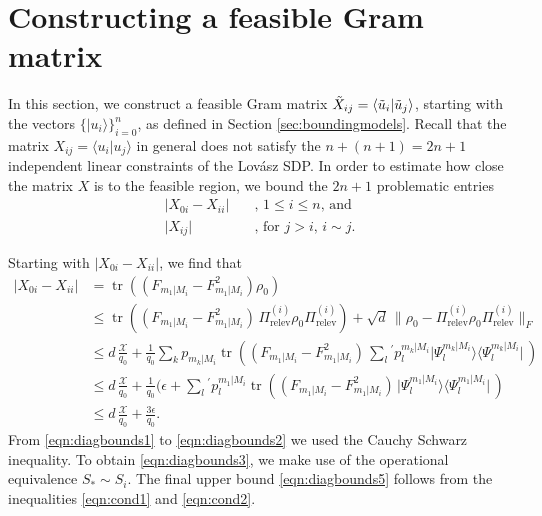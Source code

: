 \section{Constructing a feasible Gram matrix}

In this section, we construct a feasible Gram matrix $\Tilde{X}_{ij}=\langle \Tilde{u}_i \vert \Tilde{u}_j \rangle$, starting with the vectors $\{\vert u_i \rangle \}_{i=0}^n$, as defined in Section \ref{sec:boundingmodels}. Recall that the matrix $X_{ij}=\langle u_i \vert u_j \rangle$ in general does not satisfy the $n+(n+1)=2n+1$ independent linear constraints of the Lovász SDP. In order to estimate how close the matrix $X$ is to the feasible region, we bound the $2n+1$ problematic entries
\begin{align}
\vert X_{0i}-X_{ii}\vert \hspace{1em} &\text{, $1\leq i \leq n$, and} \\
\vert X_{ij} \vert \hspace{1em} & \text{, for $j>i$, $i\sim j$.}
\end{align}

Starting with $\vert X_{0i} - X_{ii}\vert$,  we find that
\begin{align}
\label{eqn:diagbounds1}
\vert X_{0i} - X_{ii} \vert & = \operatorname{tr}((F_{m_1\vert M_i}-F_{m_1\vert M_i}^2)\rho_0) \\
\label{eqn:diagbounds2}
& \leq \operatorname{tr}((F_{m_1\vert M_i}-F_{m_1\vert M_i}^2)\,\Pi_{\text{relev}}^{(i)}\rho_0\Pi_{\text{relev}}^{(i)})+\sqrt{d}\,\|\rho_0 - \Pi_{\text{relev}}^{(i)}\rho_0\Pi_{\text{relev}}^{(i)}\|_F\\
\label{eqn:diagbounds3}
& \leq d\,\frac{\mathcal{X}}{q_0}+\frac{1}{q_0}\sum_k p_{m_k\vert M_i} \operatorname{tr}((F_{m_1\vert M_i}-F_{m_1\vert M_i}^2)\,\sum_l {}^{'} p_l^{m_k\vert M_i}\vert \Psi_l^{m_k \vert M_i}\rangle \langle \Psi_l^{m_k\vert M_i}\vert\,)\\
\label{eqn:diagbounds4}
& \leq d\,\frac{\mathcal{X}}{q_0}+\frac{1}{q_0}(\epsilon + \sum_l {}^{'} p_l^{m_1\vert M_i}\operatorname{tr}((F_{m_1\vert M_i}-F_{m_1\vert M_i}^2)\, \vert \Psi_l^{m_1 \vert M_i}\rangle \langle \Psi_l^{m_1\vert M_i}\vert\,) \\
\label{eqn:diagbounds5}
& \leq d\,\frac{\mathcal{X}}{q_0}+\frac{3 \epsilon}{q_0}.
\end{align}
From \ref{eqn:diagbounds1} to \ref{eqn:diagbounds2} we used the Cauchy Schwarz inequality. To obtain \ref{eqn:diagbounds3}, we make use of the operational equivalence $S_* \sim S_i$. The final upper bound \ref{eqn:diagbounds5} follows from the inequalities \ref{eqn:cond1} and \ref{eqn:cond2}. 


